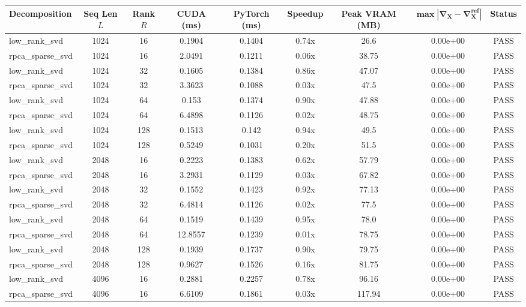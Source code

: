 \documentclass[journal]{IEEEtran}
\begin{document}
\begin{table}[t]
\centering
\small
\begin{tabular}{lcccccccc}
\toprule
\textbf{Decomposition} & \textbf{Seq Len $L$} & \textbf{Rank $R$} & \textbf{CUDA (ms)} & \textbf{PyTorch (ms)} & \textbf{Speedup} & \textbf{Peak VRAM (MB)} & $\mathbf{\max |\nabla_X - \nabla_X^{\text{ref}}|}$ & \textbf{Status} \\
\midrule
low_rank_svd & 1024 & 16 & 0.1904 & 0.1404 & 0.74x & 26.6 & 0.00e+00 & PASS \\
rpca_sparse_svd & 1024 & 16 & 2.0491 & 0.1211 & 0.06x & 38.75 & 0.00e+00 & PASS \\
low_rank_svd & 1024 & 32 & 0.1605 & 0.1384 & 0.86x & 47.07 & 0.00e+00 & PASS \\
rpca_sparse_svd & 1024 & 32 & 3.3623 & 0.1088 & 0.03x & 47.5 & 0.00e+00 & PASS \\
low_rank_svd & 1024 & 64 & 0.153 & 0.1374 & 0.90x & 47.88 & 0.00e+00 & PASS \\
rpca_sparse_svd & 1024 & 64 & 6.4898 & 0.1126 & 0.02x & 48.75 & 0.00e+00 & PASS \\
low_rank_svd & 1024 & 128 & 0.1513 & 0.142 & 0.94x & 49.5 & 0.00e+00 & PASS \\
rpca_sparse_svd & 1024 & 128 & 0.5249 & 0.1031 & 0.20x & 51.5 & 0.00e+00 & PASS \\
low_rank_svd & 2048 & 16 & 0.2223 & 0.1383 & 0.62x & 57.79 & 0.00e+00 & PASS \\
rpca_sparse_svd & 2048 & 16 & 3.2931 & 0.1129 & 0.03x & 67.82 & 0.00e+00 & PASS \\
low_rank_svd & 2048 & 32 & 0.1552 & 0.1423 & 0.92x & 77.13 & 0.00e+00 & PASS \\
rpca_sparse_svd & 2048 & 32 & 6.4814 & 0.1126 & 0.02x & 77.5 & 0.00e+00 & PASS \\
low_rank_svd & 2048 & 64 & 0.1519 & 0.1439 & 0.95x & 78.0 & 0.00e+00 & PASS \\
rpca_sparse_svd & 2048 & 64 & 12.8557 & 0.1239 & 0.01x & 78.75 & 0.00e+00 & PASS \\
low_rank_svd & 2048 & 128 & 0.1939 & 0.1737 & 0.90x & 79.75 & 0.00e+00 & PASS \\
rpca_sparse_svd & 2048 & 128 & 0.9627 & 0.1526 & 0.16x & 81.75 & 0.00e+00 & PASS \\
low_rank_svd & 4096 & 16 & 0.2881 & 0.2257 & 0.78x & 96.16 & 0.00e+00 & PASS \\
rpca_sparse_svd & 4096 & 16 & 6.6109 & 0.1861 & 0.03x & 117.94 & 0.00e+00 & PASS \\

\end{tabular}
\end{table}
\end{document}
